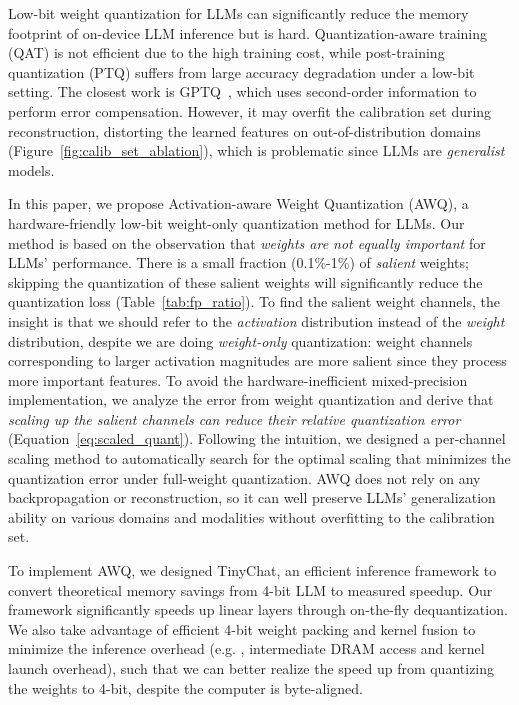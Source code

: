 Low-bit weight quantization for LLMs can significantly reduce the memory footprint of on-device LLM inference but is hard. Quantization-aware training (QAT) is not efficient due to the high training cost, while post-training quantization (PTQ) suffers from large accuracy degradation under a low-bit setting. The closest work is GPTQ~\cite{frantar2022gptq}, which uses second-order information to perform error compensation. However, it may overfit the calibration set during reconstruction, distorting the learned features on out-of-distribution domains (Figure~\ref{fig:calib_set_ablation}), which is problematic since LLMs are \emph{generalist} models. 

In this paper, we propose  Activation-aware Weight Quantization (AWQ), a hardware-friendly low-bit weight-only quantization method for LLMs. Our method is based on the observation that \emph{weights are not equally important} for LLMs' performance. There is a small fraction (0.1\%-1\%) of \emph{salient} weights; skipping the quantization of these salient weights will significantly reduce the quantization loss (Table~\ref{tab:fp_ratio}). To find the salient weight channels, the insight is that we should refer to the \emph{activation} distribution instead of the \emph{weight} distribution, despite we are doing \emph{weight-only} quantization: weight channels corresponding to larger activation magnitudes are more salient since they process more important features. To avoid the hardware-inefficient mixed-precision implementation, we analyze the error from weight quantization and derive that \emph{scaling up the salient channels can reduce their relative quantization error} (Equation~\ref{eq:scaled_quant}). Following the intuition, we designed a per-channel scaling method to automatically search for the optimal scaling that minimizes the quantization error under full-weight quantization. AWQ does not rely on any backpropagation or reconstruction, so it can well preserve LLMs’ generalization ability on various domains and modalities without overfitting to the calibration set. 

To implement AWQ, we designed TinyChat, an efficient inference framework to convert theoretical memory savings from 4-bit LLM to measured speedup. Our framework significantly speeds up linear layers through on-the-fly dequantization. We also take advantage of efficient 4-bit weight packing and kernel fusion to minimize the inference overhead (e.g. , intermediate DRAM access and kernel launch overhead), such that we can better realize the speed up from quantizing the weights to 4-bit, despite the computer is byte-aligned. 

